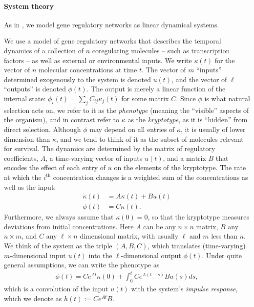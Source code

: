 \documentclass{article}
\newcommand{\1}{\mathbbm{1}}
\begin{document}
\paragraph{System theory}

As in \citet{schiffman2018system}, we model gene
regulatory networks as linear dynamical systems.

We use a model of gene regulatory networks
that describes the temporal dynamics of
a collection of $n$ coregulating molecules
-- such as transcription factors -- as well as external or environmental inputs.
We write $\kappa(t)$ for the vector of $n$ molecular concentrations at time $t$.
The vector of $m$ ``inputs'' determined exogenously to the system is denoted $u(t)$,
and the vector of $\ell$ ``outputs'' is denoted $\phi(t)$.
The output is merely a linear function of the internal state:
$\phi_i(t) = \sum_j C_{ij} \kappa_j(t)$
for some matrix $C$.
Since $\phi$ is what natural selection acts on, we refer to it as the \emph{phenotype}
(meaning the ``visible'' aspects of the organism),
and in contrast refer to $\kappa$ as the \emph{kryptotype},
as it is ``hidden'' from direct selection.
Although $\phi$ may depend on all entries of $\kappa$,
it is usually of lower dimension than $\kappa$,
and we tend to think of it as the subset of molecules relevant for survival.
The dynamics are determined by
the matrix of regulatory coefficients, $A$,
a time-varying vector of inputs $u(t)$,
and a matrix $B$ that encodes the effect of each entry of $u$ on the elements of the kryptotype.
The rate at which the $i^\text{th}$ concentration changes
is a weighted sum of the concentrations
as well as the input:
\begin{equation}\label{eqn:system}
   \begin{aligned}
    \dot{\kappa}(t) &= A \kappa(t) + B u(t) \\
    \phi(t) &= C \kappa(t) .
  \end{aligned} 
\end{equation}
Furthermore, we always assume that $\kappa(0) = 0$,
so that the kryptotype measures deviations from initial concentrations. 
Here $A$ can be any $n \times n$ matrix, $B$ any $n \times m$, and $C$ any $\ell \times n$ dimensional matrix,
with usually $\ell$ and $m$ less than $n$.
We think of the system as the triple $(A,B,C)$,
which translates (time-varying) $m$-dimensional input $u(t)$ into the $\ell$-dimensional output $\phi(t)$.
Under quite general assumptions,
we can write the phenotype as
  \begin{align}
    \phi(t) = C e^{A t} \kappa(0) + \int_{0}^{t} C e^{A (t-s)} B u(s) ds ,
  \end{align}
which is a convolution of the input $u(t)$ with the system's \emph{impulse response},
which we denote as $h(t) := Ce^{A t}B$.
\end{document}
